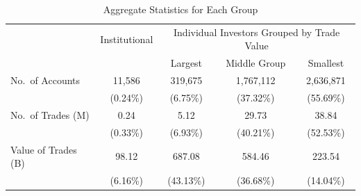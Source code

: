 \documentclass{beamer}
\begin{document}
\begin{frame}
    \begin{table}
        \caption{Aggregate Statistics for Each Group}
        {\fontsize{9}{12} \selectfont
            \begin{tabular}{l*{4}{c}}
                \toprule
                                    & Institutional & \multicolumn{3}{c}{Individual Investors Grouped by Trade Value}                            \\
                \cmidrule(r){3-5}
                                    &               & Largest                                                         & Middle Group & Smallest  \\

                \midrule

                No.\ of Accounts    & 11,586        & 319,675                                                         & 1,767,112    & 2,636,871 \\
                                    & (0.24\%)      & (6.75\%)                                                        & (37.32\%)    & (55.69\%) \\
                \addlinespace

                No.\ of Trades (M)  & 0.24          & 5.12                                                            & 29.73        & 38.84     \\
                                    & (0.33\%)      & (6.93\%)                                                        & (40.21\%)    & (52.53\%) \\
                \addlinespace

                Value of Trades (B) & 98.12         & 687.08                                                          & 584.46       & 223.54    \\
                                    & (6.16\%)      & (43.13\%)                                                       & (36.68\%)    & (14.04\%) \\
                \bottomrule
            \end{tabular}
        }
    \end{table}
\end{frame}
\end{document}
